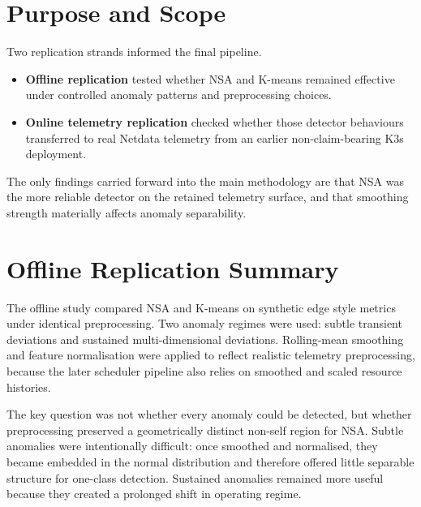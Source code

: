 \begin{appendices}
\section{Purpose and Scope}

Two replication strands informed the final pipeline.

\begin{itemize}
\item \textbf{Offline replication} tested whether NSA and K-means remained effective under controlled anomaly patterns and preprocessing choices.
\item \textbf{Online telemetry replication} checked whether those detector behaviours transferred to real Netdata telemetry from an earlier non-claim-bearing K3s deployment.
\end{itemize}

The only findings carried forward into the main methodology are that NSA was the more reliable detector on the retained telemetry surface, and that smoothing strength materially affects anomaly separability.

\section{Offline Replication Summary}

The offline study compared NSA and K-means on synthetic edge style metrics under identical preprocessing. Two anomaly regimes were used: subtle transient deviations and sustained multi-dimensional deviations. Rolling-mean smoothing and feature normalisation were applied to reflect realistic telemetry preprocessing, because the later scheduler pipeline also relies on smoothed and scaled resource histories.

The key question was not whether every anomaly could be detected, but whether preprocessing preserved a geometrically distinct non-self region for NSA. Subtle anomalies were intentionally difficult: once smoothed and normalised, they became embedded in the normal distribution and therefore offered little separable structure for one-class detection. Sustained anomalies remained more useful because they created a prolonged shift in operating regime.


\end{appendices}
